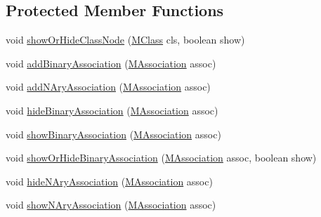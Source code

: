 \subsection*{Protected Member Functions}
\begin{DoxyCompactItemize}
\item 
void \hyperlink{classorg_1_1tzi_1_1use_1_1gui_1_1views_1_1diagrams_1_1classdiagram_1_1_class_diagram_af6eb5fe3feefa13eb55cf99c91744fba}{show\-Or\-Hide\-Class\-Node} (\hyperlink{interfaceorg_1_1tzi_1_1use_1_1uml_1_1mm_1_1_m_class}{M\-Class} cls, boolean show)
\item 
void \hyperlink{classorg_1_1tzi_1_1use_1_1gui_1_1views_1_1diagrams_1_1classdiagram_1_1_class_diagram_a01d13ccf618407f408f31f9b0cb1abcc}{add\-Binary\-Association} (\hyperlink{interfaceorg_1_1tzi_1_1use_1_1uml_1_1mm_1_1_m_association}{M\-Association} assoc)
\item 
void \hyperlink{classorg_1_1tzi_1_1use_1_1gui_1_1views_1_1diagrams_1_1classdiagram_1_1_class_diagram_a765f2024e737ad7256cc63a5eee0d0dc}{add\-N\-Ary\-Association} (\hyperlink{interfaceorg_1_1tzi_1_1use_1_1uml_1_1mm_1_1_m_association}{M\-Association} assoc)
\item 
void \hyperlink{classorg_1_1tzi_1_1use_1_1gui_1_1views_1_1diagrams_1_1classdiagram_1_1_class_diagram_a33a0a77db79e6e2955effc6fd5b97cae}{hide\-Binary\-Association} (\hyperlink{interfaceorg_1_1tzi_1_1use_1_1uml_1_1mm_1_1_m_association}{M\-Association} assoc)
\item 
void \hyperlink{classorg_1_1tzi_1_1use_1_1gui_1_1views_1_1diagrams_1_1classdiagram_1_1_class_diagram_a4586d20d697ac5454b86da919edc3b4d}{show\-Binary\-Association} (\hyperlink{interfaceorg_1_1tzi_1_1use_1_1uml_1_1mm_1_1_m_association}{M\-Association} assoc)
\item 
void \hyperlink{classorg_1_1tzi_1_1use_1_1gui_1_1views_1_1diagrams_1_1classdiagram_1_1_class_diagram_af9aedef63d963ef345774454bbfe90d9}{show\-Or\-Hide\-Binary\-Association} (\hyperlink{interfaceorg_1_1tzi_1_1use_1_1uml_1_1mm_1_1_m_association}{M\-Association} assoc, boolean show)
\item 
void \hyperlink{classorg_1_1tzi_1_1use_1_1gui_1_1views_1_1diagrams_1_1classdiagram_1_1_class_diagram_a4b5e517485966e3a2d6ff2b8bae7e40a}{hide\-N\-Ary\-Association} (\hyperlink{interfaceorg_1_1tzi_1_1use_1_1uml_1_1mm_1_1_m_association}{M\-Association} assoc)
\item 
void \hyperlink{classorg_1_1tzi_1_1use_1_1gui_1_1views_1_1diagrams_1_1classdiagram_1_1_class_diagram_ab187d693544861ea98010d8e383273a7}{show\-N\-Ary\-Association} (\hyperlink{interfaceorg_1_1tzi_1_1use_1_1uml_1_1mm_1_1_m_association}{M\-Association} assoc)

\end{DoxyCompactItemize}
